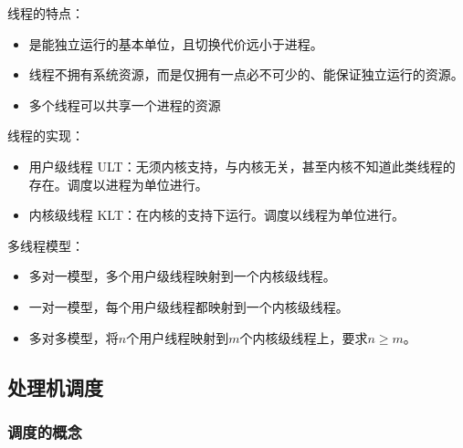\documentclass[12pt, a4paper, oneside]{ctexart}
\begin{document}
线程的特点：
\begin{itemize}
    \item 是能独立运行的基本单位，且切换代价远小于进程。
    \item 线程不拥有系统资源，而是仅拥有一点必不可少的、能保证独立运行的资源。
    \item 多个线程可以共享一个进程的资源
\end{itemize}

线程的实现：
\begin{itemize}
  \item 用户级线程 ULT：无须内核支持，与内核无关，甚至内核不知道此类线程的存在。调度以进程为单位进行。
  \item 内核级线程 KLT：在内核的支持下运行。调度以线程为单位进行。
\end{itemize}

多线程模型：
\begin{itemize}
  \item 多对一模型，多个用户级线程映射到一个内核级线程。
  \item 一对一模型，每个用户级线程都映射到一个内核级线程。
  \item 多对多模型，将$n$个用户线程映射到$m$个内核级线程上，要求$n\geq m$。
\end{itemize}

\subsection{处理机调度}

\subsubsection{调度的概念}
\end{document}
